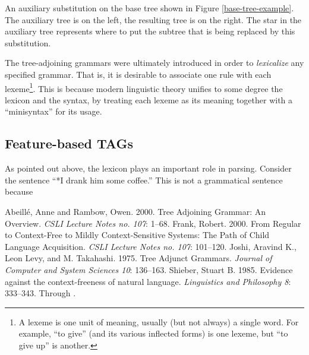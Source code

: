 \documentclass[12pt]{article}
\newcommand{\defn}[1]{\textit{#1}}
\begin{document}
\begin{Figure}
\begin{center}
\end{center}
\caption{An auxiliary substitution on the base tree shown in Figure
\ref{base-tree-example}.  The auxiliary tree is on the left, the
resulting tree is on the right.  The star in the auxiliary tree
represents where to put the subtree that is being replaced by this
substitution.}
\label{adjoining-substitution}
\end{Figure}

The tree-adjoining grammars were ultimately introduced in order to
\defn{lexicalize} any specified grammar.  That is, it is desirable to
associate one rule with each lexeme\footnote{A lexeme is one unit of
meaning, usually (but not always) a single word.  For example, ``to
give'' (and its various inflected forms) is one lexeme, but ``to give
up'' is another.}.  This is because modern linguistic theory unifies to
some degree the lexicon and the syntax, by treating each lexeme as its
meaning together with a ``minisyntax'' for its usage.

\subsection{Feature-based TAGs}

As pointed out above, the lexicon plays an important role in parsing.
Consider the sentence ``*I drank him some coffee.''  This is not a
grammatical sentence because 

\clearpage

\singlespace
\begin{thebibliography}{4in}
 Abeill\'e, Anne and Rambow, Owen.  2000.  Tree
Adjoining Grammar: An Overview.  \textit{CSLI Lecture Notes no. 107}:
1--68.
 Frank, Robert.  2000.  From Regular to Context-Free
to Mildly Context-Sensitive Systems: The Path of Child Language
Acquisition.  \textit{CSLI Lecture Notes no. 107}: 101--120.
 Joshi, Aravind K., Leon Levy, and M. Takahashi.
1975. Tree Adjunct Grammars. \textit{Journal of Computer and System
Sciences 10}: 136--163.
 Shieber, Stuart B.  1985. Evidence against the
context-freeness of natural language.  \textit{Linguistics and
Philosophy 8}: 333--343.  Through \cite{Abeille-2000}.
\end{thebibliography}
\end{document}
